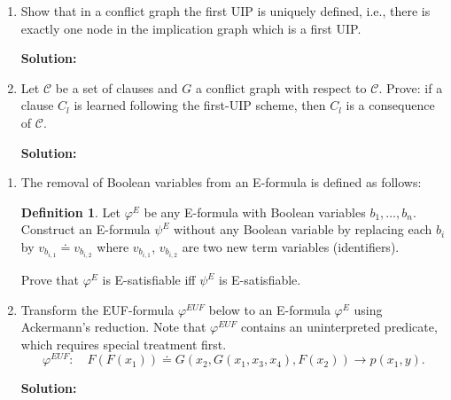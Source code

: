 \documentclass[11pt,a4paper]{uebung}
\newcommand{\solution}[1]{\par {\bf Solution:}\\#1}
\begin{document}
\begin{enumerate}
\item Show that in a conflict graph the first UIP is uniquely defined, i.e.,
  there is exactly one node in the implication graph which is a first UIP.

\solution{

}

\item Let $\mathcal{C}$ be a set of clauses and $G$ a conflict graph with
  respect to $\mathcal{C}$. Prove: if a clause $C_l$ is learned following the
  first-UIP scheme, then $C_l$ is a consequence of $\mathcal{C}$.

\solution{

}
\end{enumerate}



\theoremstyle{definition}
\newtheorem*{definition}{Definition}
\begin{enumerate}
  \item The removal of Boolean variables from an E-formula is defined as follows:
    \begin{definition}
      Let $\varphi^E$ be any E-formula with Boolean variables $b_1, \ldots,
      b_n$. Construct an E-formula $\psi^E$ without any Boolean variable by
      replacing each $b_i$ by $v_{b_{i,1}} \doteq v_{b_{i,2}}$ where $v_{b_{i,1}}$,
      $v_{b_{i,2}}$ are two new term variables (identifiers).
    \end{definition}
    Prove that $\varphi^E$ is E-satisfiable iff $\psi^E$ is E-satisfiable.

  \item
    Transform the EUF-formula $\varphi^{EUF}$ below to an E-formula
    $\varphi^E$ using Ackermann's reduction. Note that $\varphi^{EUF}$
    contains an uninterpreted predicate, which requires special treatment
    first.
    \begin{displaymath}
      \varphi^{EUF}: \quad F(F(x_1)) \doteq G(x_2,G(x_1,x_3,x_4),F(x_2)) \rightarrow p(x_1,y).
    \end{displaymath}

\solution{

}
\end{enumerate}
\end{document}
